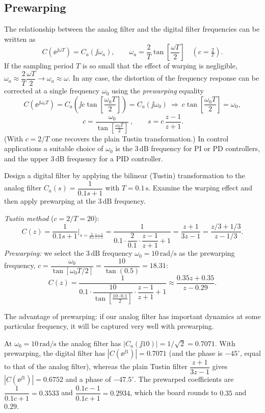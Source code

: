 \subsection{Prewarping}
The relationship between the analog filter and the digital filter frequencies can be written as
\[
  C(\ee^{\jj\omega T})=C_a(\jj\omega_a),\qquad\omega_a=\frac2T\tan\!\left[\frac{\omega T}{2}\right]\quad(c=\tfrac2T).
\]
If the sampling period $T$ is so small that the effect of warping is negligible, $\omega_a\approx\dfrac2T\dfrac{\omega T}{2}\to\omega_a\approx\omega$.
In any case, the distortion of the frequency response can be corrected at a single frequency $\omega_0$ using the
\emph{prewarping} equality
\[
  C(\ee^{\jj\omega_0T})=C_a\!\left(\jj c\tan\!\left[\frac{\omega_0T}{2}\right]\right)=C_a(\jj\omega_0)
  \ \Rightarrow\ c\tan\!\left[\frac{\omega_0T}{2}\right]=\omega_0,
\]
\[
  \boxed{\,c=\frac{\omega_0}{\tan\!\left[\frac{\omega_0T}{2}\right]}\,},\qquad s=c\,\frac{z-1}{z+1}.
\]
(With $c=2/T$ one recovers the plain Tustin transformation.) In control applications a suitable choice of $\omega_0$ is the
$3\,\mathrm{dB}$ frequency for PI or PD controllers, and the upper $3\,\mathrm{dB}$ frequency for a PID controller.
\begin{center}
\figThreeDB
\end{center}

\begin{example}
Design a digital filter by applying the bilinear (Tustin) transformation to the analog filter
$C_a(s)=\dfrac{1}{0.1s+1}$ with $T=0.1\,\mathrm{s}$. Examine the warping effect and then apply prewarping at the
$3\,\mathrm{dB}$ frequency.

\emph{Tustin method} ($c=2/T=20$):
\[
  C(z)=\frac{1}{0.1s+1}\Big|_{s=\frac{2}{0.1}\frac{z-1}{z+1}}=\frac{1}{0.1\cdot\dfrac{2}{0.1}\cdot\dfrac{z-1}{z+1}+1}=\frac{z+1}{3z-1}
  =\frac{z/3+1/3}{z-1/3}.
\]
\emph{Prewarping:} we select the $3\,\mathrm{dB}$ frequency $\omega_0=10\,\mathrm{rad/s}$ as the prewarping frequency,
$c=\dfrac{\omega_0}{\tan[\omega_0T/2]}=\dfrac{10}{\tan(0.5)}=18.31$:
\[
  C(z)=\frac{1}{0.1\cdot\dfrac{10}{\tan\left[\frac{10\cdot0.1}{2}\right]}\cdot\dfrac{z-1}{z+1}+1}\approx\frac{0.35z+0.35}{z-0.29}.
\]
\end{example}
The advantage of prewarping: if our analog filter has important dynamics at some particular frequency, it will be
captured very well with prewarping.

\begin{remark}
At $\omega_0=10\,\mathrm{rad/s}$ the analog filter has $|C_a(\jj10)|=1/\sqrt2=0.7071$. With prewarping, the digital filter has
$|C(\ee^{\jj1})|=0.7071$ (and the phase is $-45^{\circ}$, equal to that of the analog filter), whereas the plain Tustin
filter $\dfrac{z+1}{3z-1}$ gives $|C(\ee^{\jj1})|=0.6752$ and a phase of $-47.5^{\circ}$. The prewarped coefficients are
$\dfrac{1}{0.1c+1}=0.3533$ and $\dfrac{0.1c-1}{0.1c+1}=0.2934$, which the board rounds to $0.35$ and $0.29$.
\end{remark}


